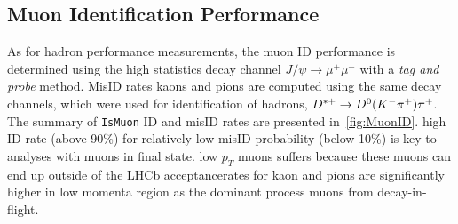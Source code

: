 \subsection{Muon Identification Performance}
\label{muonperf}
As for hadron performance measurements, the muon ID performance is determined using the high statistics decay channel $J/\psi \rightarrow \mu^{+} \mu^{-}$ with a \textit{tag and probe} method. MisID rates \DIFdelbegin {}\DIFdelend \DIFaddbegin {}\DIFaddend kaons and pions are computed using the same decay channels, which were used for \DIFaddbegin {}\DIFaddend identification of hadrons, $D^{*+} \rightarrow D^{0}({K}^{-}{{\pi}^+}){{\pi}^+}$. The summary of \texttt{IsMuon} ID and misID rates are presented in~\autoref{fig:MuonID}. \DIFdelbegin {}\DIFdelend \DIFaddbegin {}\DIFaddend high ID rate (above 90\%) for relatively low misID probability (below 10\%) is key to analyses with muons in \DIFdelbegin {}\DIFdelend \DIFaddbegin {}\DIFaddend final state. \DIFdelbegin {}\DIFdelend \DIFaddbegin {}\DIFaddend low $p_{T}$ muons \DIFdelbegin {}\DIFdelend suffers because these muons can end up outside of the \gls{LHCb} acceptance\DIFdelbegin {}\DIFdelend \DIFaddbegin {}\DIFaddend rates for kaon and pions are significantly higher in \DIFaddbegin {}\DIFaddend low momenta region as the dominant process \DIFdelbegin {}\DIFdelend \DIFaddbegin {}\DIFaddend muons from decay-in-flight.   

